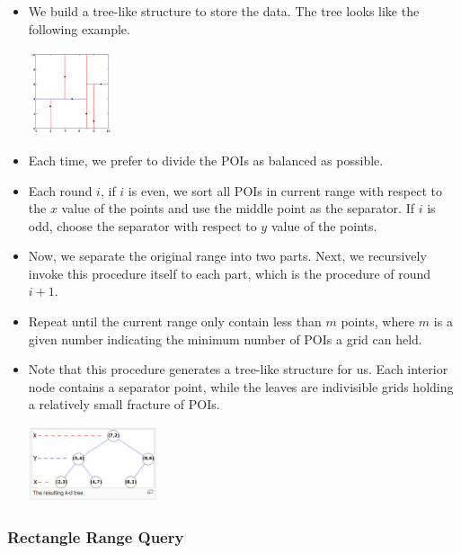 \documentclass{acm_proc_article-sp}
\begin{document}
\begin{itemize}
\item We build a tree-like structure to store the data. The tree looks like the following example.
\begin{center}
\includegraphics[width=0.2\textwidth]{pics/1.png}
\end{center}
\item Each time, we prefer to divide the POIs as balanced as possible. 
\item Each round $i$, if $i$ is even, we sort all POIs in current range with respect to the $x$ value of the points and use the middle point as the separator. If $i$ is odd, choose the separator with respect to $y$ value of the points. 
\item Now, we separate the original range into two parts. Next, we recursively invoke this procedure itself to each part, which is the procedure of round $i+1$.
\item Repeat until the current range only contain less than $m$ points, where $m$ is a given number indicating the minimum number of POIs a grid can held.
\item Note that this procedure generates a tree-like structure for us. Each interior node contains a separator point, while the leaves are indivisible grids holding a relatively small fracture of POIs.
\begin{center}
\includegraphics[width=0.3\textwidth]{pics/2.png}
\end{center}
\end{itemize}

\subsubsection{Rectangle Range Query}
\end{document}

